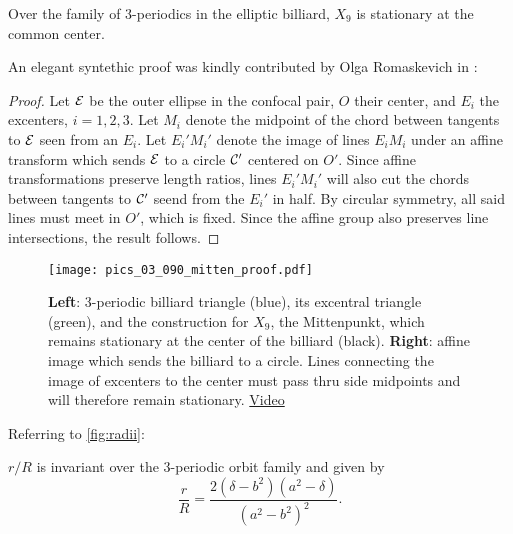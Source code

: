 \begin{theorem}
Over the family of 3-periodics in the elliptic billiard, $X_9$ is stationary at the common center.
\end{theorem}

An elegant syntethic proof was kindly contributed by Olga Romaskevich in \cite{olga19_mitten}:

\begin{proof}
Let $\mathcal{E}$ be the outer ellipse in the confocal pair, $O$ their center, and $E_i$ the excenters, $i=1,2,3$. Let $M_i$ denote the midpoint of the chord between tangents to $\mathcal{E}$ seen from an $E_i$. Let $E_i' M_i'$ denote the image of lines $E_i M_i$ under an affine transform which sends $\mathcal{E}$ to a circle $\mathcal{C}'$ centered on $O'$. Since affine transformations preserve length ratios, lines $E_i' M_i'$ will also cut the chords between tangents to $\mathcal{C}'$ seend from the $E_i'$ in half. By circular symmetry, all said lines must meet in $O'$, which is fixed. Since the affine group also preserves line intersections, the result follows.
\end{proof}

\begin{figure}
     \centering
    \texttt{[image: pics\_03\_090\_mitten\_proof.pdf]}    
     \caption{\textbf{Left}: 3-periodic billiard triangle (blue), its excentral triangle (green), and the construction for $X_9$, the Mittenpunkt, which remains stationary at the center of the billiard (black). \textbf{Right}: affine image which sends the billiard to a circle. Lines connecting the image of excenters to the center must pass thru side midpoints and will therefore remain stationary.  %
     \href{https://youtu.be/tMrBqfRBYik}{Video}}
     \label{fig:x9} 
\end{figure}

Referring to \cref{fig:radii}:

\begin{theorem}
\label{thm:rovR}
$r/R$ is invariant over the 3-periodic orbit family and given by
\begin{equation}
\label{eqn:rovR}
\frac{r}{R}=\frac{2 (\delta-b^2)(a^2-\delta)}{(a^2-b^2)^2}.
\end{equation}
\end{theorem}

